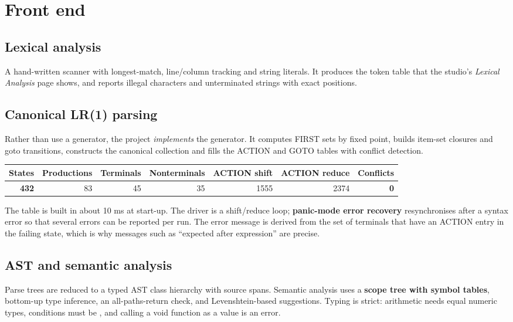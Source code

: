 \documentclass[11pt,a4paper]{article}
\begin{document}
\section{Front end}
\subsection{Lexical analysis}
A hand-written scanner with longest-match, line/column tracking and string literals. It produces the token table that the studio's \emph{Lexical Analysis} page shows, and reports illegal characters and unterminated strings with exact positions.

\subsection{Canonical LR(1) parsing}
Rather than use a generator, the project \emph{implements} the generator. It computes FIRST sets by fixed point, builds item-set closures and goto transitions, constructs the canonical collection and fills the ACTION and GOTO tables with conflict detection.
\begin{center}\small\sffamily
\begin{tabular}{@{}rrrrrrr@{}}\toprule
States&Productions&Terminals&Nonterminals&ACTION shift&ACTION reduce&Conflicts\\\midrule
\textbf{432}&83&45&35&1555&2374&\textbf{0}\\\bottomrule
\end{tabular}
\end{center}
The table is built in about 10 ms at start-up. The driver is a shift/reduce loop; \textbf{panic-mode error recovery} resynchronises after a syntax error so that several errors can be reported per run. The error message is derived from the set of terminals that have an ACTION entry in the failing state, which is why messages such as ``expected \code{;} after expression'' are precise.

\subsection{AST and semantic analysis}
Parse trees are reduced to a typed AST class hierarchy with source spans. Semantic analysis uses a \textbf{scope tree with symbol tables}, bottom-up type inference, an all-paths-return check, and Levenshtein-based suggestions. Typing is strict: arithmetic needs equal numeric types, conditions must be , and calling a void function as a value is an error.
\end{document}
